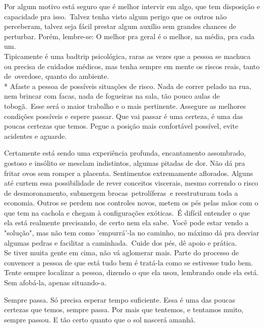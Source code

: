 \documentclass[pdftex]{article}
\begin{document}
\par
\noindent Por algum motivo está seguro que é melhor intervir em algo, que tem disposição e capacidade pra isso. Talvez tenha
visto algum perigo que os outros não perceberam, talvez seja fácil prestar algum auxílio sem grandes chances de perturbar.
Porém, lembre-se: O melhor pra geral é o melhor, na média, pra cada um.\\
\indent Tipicamente é uma badtrip psicológica, raras as vezes que a pessoa se machuca ou precisa de cuidados médicos, mas tenha sempre
em mente os riscos reais, tanto de overdose, quanto do ambiente.\\*
\indent Afaste a pessoa de possíveis situações de risco. Nada de correr pelado na rua, nem brincar com facas, nada de fogueiras
na sala, tão pouco aulas de tobogã. Esse será o maior trabalho e o mais pertinente. Assegure as melhores condições possíveis e
espere passar. Que vai passar é uma certeza, é uma das poucas certezas que temos. Pegue a posição mais confortável possível,
evite acidentes e aguarde.\\
\par
\indent Certamente está sendo uma experiência profunda, encantamento assombrado, gostoso e insólito se mesclam indistintos,
algumas pitadas de dor. Não dá pra fritar ovos sem romper a placenta. Sentimentos extremamente aflorados. Alguns até curtem essa
possibilidade de rever conceitos viscerais, mesmo correndo o risco de desmoronamento, submergem brocas petrolíferas e
reestruturam toda a economia. Outros se perdem nos controles novos, metem os pés pelas mãos com o que tem na cachola e chegam à
configurações exóticas. É difícil entender o que ela está realmente precisando, de certo nem ela sabe. Você pode estar vendo a
"solução", mas não tem como 'empurrá'-la no caminho, no máximo dá pra desviar algumas pedras e facilitar a caminhada. Cuide dos
pés, dê apoio e prática.\\
\noindent Se tiver muita gente em cima, não vá aglomerar mais. Parte do processo de convencer a pessoa de que está tudo bem é
tratá-la como se estivesse tudo bem.
Tente sempre localizar a pessoa, dizendo o que ela usou, lembrando onde ela está. Sem afobá-la, apenas situando-a.\\
\par
\indent Sempre passa. Só precisa esperar tempo suficiente. Essa é uma das poucas certezas que temos, sempre passa. Por mais que
tentemos, e tentamos muito, sempre passou. E tão certo quanto que o sol nascerá amanhã.
%
%
%
%
\end{document}
